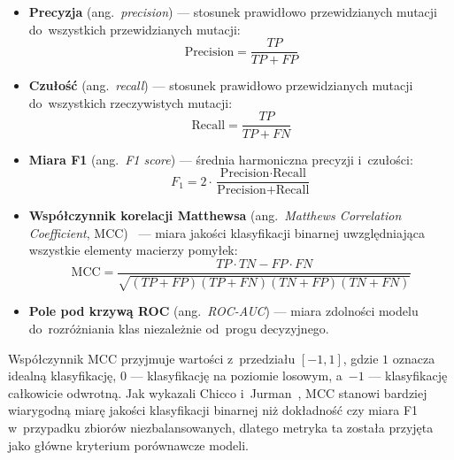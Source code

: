 \begin{itemize}
    \item \textbf{Precyzja} (ang.~\textit{precision}) --- stosunek prawidłowo przewidzianych mutacji do~wszystkich przewidzianych mutacji:
    \begin{equation}
        \text{Precision} = \frac{TP}{TP + FP}
        \label{eq:precision}
    \end{equation}

    \item \textbf{Czułość} (ang.~\textit{recall}) --- stosunek prawidłowo przewidzianych mutacji do~wszystkich rzeczywistych mutacji:
    \begin{equation}
        \text{Recall} = \frac{TP}{TP + FN}
        \label{eq:recall}
    \end{equation}

    \item \textbf{Miara F1} (ang.~\textit{F1 score}) --- średnia harmoniczna precyzji i~czułości:
    \begin{equation}
        F_1 = 2 \cdot \frac{\text{Precision} \cdot \text{Recall}}{\text{Precision} + \text{Recall}}
        \label{eq:f1}
    \end{equation}

    \item \textbf{Współczynnik korelacji Matthewsa} (ang.~\textit{Matthews Correlation Coefficient}, MCC)~\cite{matthews1975mcc} --- miara jakości klasyfikacji binarnej uwzględniająca wszystkie elementy macierzy pomyłek:
    \begin{equation}
        \text{MCC} = \frac{TP \cdot TN - FP \cdot FN}{\sqrt{(TP+FP)(TP+FN)(TN+FP)(TN+FN)}}
        \label{eq:mcc-eval}
    \end{equation}

    \item \textbf{Pole pod krzywą ROC} (ang.~\textit{ROC-AUC}) --- miara zdolności modelu do~rozróżniania klas niezależnie od~progu decyzyjnego.
\end{itemize}

Współczynnik MCC przyjmuje wartości z~przedziału $[-1, 1]$, gdzie $1$ oznacza idealną klasyfikację, $0$ --- klasyfikację na poziomie losowym, a~$-1$ --- klasyfikację całkowicie odwrotną. Jak wykazali Chicco i~Jurman~\cite{chicco2020mcc}, MCC stanowi bardziej wiarygodną miarę jakości klasyfikacji binarnej niż dokładność czy miara F1 w~przypadku zbiorów niezbalansowanych, dlatego metryka ta została przyjęta jako główne kryterium porównawcze modeli.

